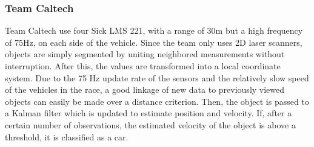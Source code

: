 \documentclass[11pt,oneside,openright]{mpreport}
\begin{document}
\subsubsection{Team Caltech}
Team Caltech \cite{Aly2007} use four Sick LMS 221, with a range of 30m but a high frequency of 75Hz, on each side of the vehicle. 
Since the team only uses 2D laser scanners, objects are simply segmented by uniting neighbored measurements without interruption. 
After this, the values are transformed into a local coordinate system. Due to the 75 Hz update rate of the sensors and the relatively 
slow speed of the vehicles in the race, a good linkage of new data to previously viewed objects can easily be made over a distance criterion.
Then, the object is passed to a Kalman filter which is updated to estimate position and velocity. If, after a certain number of observations, 
the estimated velocity of the object is above a threshold, it is classified as a car.
\end{document}
